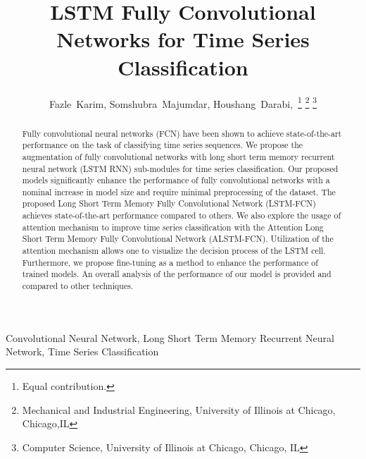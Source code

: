 \documentclass[article]{IEEEtran}
\begin{document}
\title{LSTM Fully Convolutional Networks for Time Series Classification}
\makeatletter
\let\@fnsymbol\@arabic
\makeatother

\author{Fazle~Karim,
        Somshubra~Majumdar,
        Houshang~Darabi,~\thanks{Equal contribution.}
\thanks{Mechanical and Industrial Engineering, University of Illinois at Chicago, Chicago,IL}
\thanks{Computer Science, University of Illinois at Chicago, Chicago, IL}}
















\maketitle


\begin{abstract}
Fully convolutional neural networks (FCN) have been shown to achieve state-of-the-art performance on the task of classifying time series sequences. We propose the augmentation of fully convolutional networks with long short term memory recurrent neural network (LSTM RNN) sub-modules for time series classification. Our proposed models significantly enhance the performance of fully convolutional networks with a nominal increase in model size and require minimal preprocessing of the dataset. The proposed Long Short Term Memory Fully Convolutional Network (LSTM-FCN) achieves state-of-the-art performance compared to others. We also explore the usage of attention mechanism to improve time series classification with the Attention Long Short Term Memory Fully Convolutional Network (ALSTM-FCN).  Utilization of the attention mechanism allows one to visualize the decision process of the LSTM cell. Furthermore, we propose fine-tuning as a method to enhance the performance of trained models. An  overall  analysis  of  the  performance  of  our  model  is  provided  and  compared  to  other techniques. \end{abstract}


\begin{IEEEkeywords}
 Convolutional Neural Network, Long Short Term Memory Recurrent Neural Network, Time Series Classification
\end{IEEEkeywords}


\IEEEpeerreviewmaketitle
\end{document}

